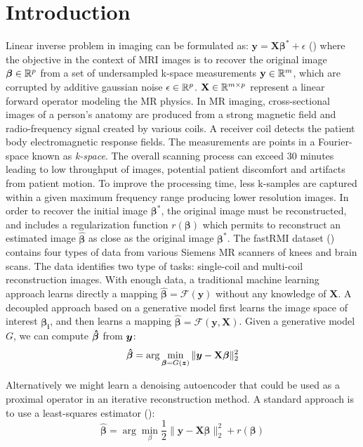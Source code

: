 \documentclass[12pt,twoside]{article}
\begin{document}
\section*{Introduction}
Linear inverse problem in imaging can be formulated as: $\textbf{y} = \mathbf{X} \bm{\beta^*} + \epsilon$ (\cite{DBLP:journals/corr/abs-1901-03707}) 
where the objective in the context of MRI images is to recover the original image
$\bm{\beta} \in \mathbb{R}^p$ from a set of undersampled k-space measurements  $\textbf{y} \in \mathbb{R}^m$,  which are corrupted by additive gaussian noise $\epsilon \in \mathbb{R}^p$.
$ \mathbf{X} \in \mathbb{R}^{m \times p}$ represent a linear forward operator modeling the MR physics. In MR imaging, cross-sectional images of a person's anatomy are produced
from a strong magnetic field and radio-frequency signal created by various coils. A receiver coil detects the patient body electromagnetic response fields. The measurements are points in
a Fourier-space known as  \emph{k-space}. The overall scanning process can exceed $30$ minutes leading to low throughput of images, potential patient discomfort and artifacts
from patient motion. To improve the processing time, less k-samples are captured within a given maximum frequency range producing lower resolution images. In order to recover the initial
image $\bm{\beta^*}$, the original image must be reconstructed, and includes a regularization  function $r(\bm{\beta})$ 
which permits to reconstruct an estimated image $\hat{\bm{\beta}}$ 
as close as the original image $\bm{\beta^*}$. The fastRMI dataset (\cite{DBLP:journals/corr/abs-1811-08839}) contains four types of data from various Siemens MR scanners of knees and brain scans. The data identifies two type of tasks:
 single-coil  and multi-coil reconstruction images. With enough data, a traditional machine learning approach learns directly a mapping $\bm{\hat{\beta}} = \mathcal{F}(\textbf{y})$ without any knowledge of $\mathbf{X}$.
 A decoupled approach based on a generative model first learns the image space of interest $\bm{\beta_i}$, and then learns a mapping $\bm{\hat{\beta}} = \mathcal{F}(\textbf{y}, \mathbf{X})$.
 Given a generative model $G$, we can compute $\bm{\hat{\beta}}$ from $\bm{y}$:
 $$\bm{\hat{\beta}} = \arg \min_{\bm{\beta} = G(\bm{z})} \| \bm{y} - {\mathbf X} \bm{\beta} \|_2^2 $$

 
 Alternatively we might learn a denoising autoencoder that could be used as a proximal operator in an iterative reconstruction method.
 A standard approach is to use a least-squares estimator (\cite{DBLP:journals/corr/KamilovM15}):
 $$ \bm{\hat{\beta}} = \arg \min_{\beta} \frac{1}{2} \| \textbf{y} - \mathbf{X} \bm{\beta} \|_2^2 + r(\bm{\beta})$$
 
\end{document}
